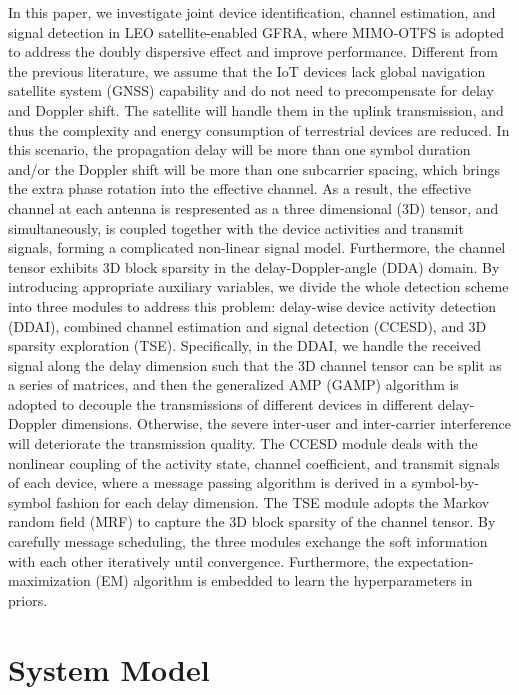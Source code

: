 \documentclass[conference]{IEEEtran}
\begin{document}
	In this paper, we investigate joint device identification, channel estimation, and signal detection in LEO satellite-enabled GFRA, where MIMO-OTFS is adopted to address the doubly dispersive effect and improve performance. Different from the previous literature, we assume that the IoT devices lack global navigation satellite system (GNSS) capability and do not need to precompensate for delay and Doppler shift. The satellite will handle them in the uplink transmission, and thus the complexity and energy consumption of terrestrial devices are reduced. In this scenario, the propagation delay will be more than one symbol duration and/or the Doppler shift will be more than one subcarrier spacing, which brings the extra phase rotation into the effective channel. As a result, the effective channel at each antenna is respresented as a three dimensional (3D) tensor, and simultaneously, is coupled together with the device activities and transmit signals, forming a complicated non-linear signal model. Furthermore, the channel tensor exhibits 3D block sparsity in the delay-Doppler-angle (DDA) domain. 
	By introducing appropriate auxiliary variables, we divide the whole detection scheme into three modules to address this problem: delay-wise device activity detection (DDAI), combined channel estimation and signal detection (CCESD), and 3D sparsity exploration (TSE). Specifically, in the DDAI, we handle the received signal along the delay dimension such that the 3D channel tensor can be split as a series of matrices, and then the generalized AMP (GAMP) algorithm is adopted to decouple the transmissions of different devices in different delay-Doppler dimensions. Otherwise, the severe inter-user and inter-carrier interference will deteriorate the transmission quality. The CCESD module deals with the nonlinear coupling of the activity state, channel coefficient, and transmit signals of each device, where a message passing algorithm is
	derived in a symbol-by-symbol fashion for each delay dimension. The TSE module adopts the Markov random field (MRF) to capture the 3D block sparsity of the channel tensor. By carefully message scheduling, the three modules exchange the soft information with each other iteratively until convergence. Furthermore, the expectation-maximization (EM) algorithm is embedded to learn the hyperparameters in priors.
	
	\section{System Model}
	
\end{document}

